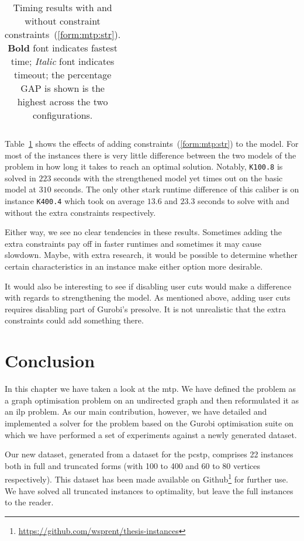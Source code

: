 \begin{table}[h!]
  \centering
  \begin{tabular}[h!]{|c|c|c|c|c|}\hline
    
  \end{tabular}
  \caption{Timing results with and without constraint constraints~(\ref{form:mtp:str}).
    \textbf{Bold} font indicates fastest time;
    \textit{Italic} font indicates
    timeout; the percentage GAP is shown is the highest across the two configurations.} 
  \label{tab:jmp:strengthen}
\end{table}

Table~\ref{tab:jmp:strengthen} shows the effects of adding constraints~(\ref{form:mtp:str}) to
the model. For most of the instances there is very little difference between the two models
of the problem in how long it takes to reach an optimal solution. Notably, \texttt{K100.8} is
solved in $223$ seconds with the strengthened model yet times out on the basic model at $310$
seconds. The only other stark runtime difference of this caliber is on instance \texttt{K400.4}
which took on average $13.6$ and $23.3$ seconds to solve with and without the extra constraints
respectively.

Either way, we see no clear tendencies in these results. Sometimes adding the extra constraints
pay off in faster runtimes and sometimes it may cause slowdown. Maybe, with extra research, it
would be possible to determine whether certain characteristics in an instance make either option
more desirable.

It would also be interesting to see if disabling user cuts would make a difference with regards
to strengthening the model. As mentioned above, adding user cuts requires disabling part of
Gurobi's presolve. It is not unrealistic that the extra constraints could add something there.
\section{Conclusion}
In this chapter we have taken a look at the \acrlong{mtp}. We have defined the problem as
a graph optimisation problem on an undirected graph and then reformulated it as an \gls{ilp}
problem. As our main contribution, however, we have detailed and implemented a solver for the
problem based on the Gurobi optimisation suite on which we have performed a set of experiments
against a newly generated dataset.

Our new dataset, generated from a dataset for the \gls{pcstp}, comprises 22 instances both in
full and truncated forms (with 100 to 400 and 60 to 80 vertices respectively). This dataset
has been made available on
Github\footnote{\url{https://github.com/wsprent/thesis-instances}}
for further use. We have solved all truncated instances to
optimality, but leave the full instances to the reader.

